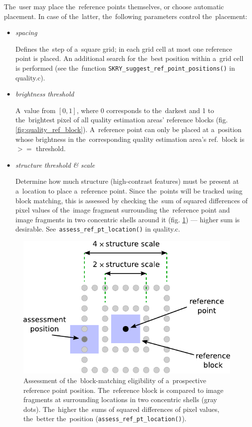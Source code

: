 \documentclass[12pt]{article}
\begin{document}
The~user may place the~reference points themselves, or choose automatic placement. In case of the~latter, the~following
parameters control the~placement:

\begin{itemize}
\item \emph{spacing}
\nopagebreak

Defines the~step of a~square grid; in each grid cell at most one reference point is placed. An additional search
for the~best position within a~grid cell is performed (see the~function \lstinline$SKRY_suggest_ref_point_positions()$
in {\ttfamily quality.c}).

\item \emph{brightness threshold}
\nopagebreak

A~value from $[0, 1]$, where 0 corresponds to the~darkest and 1 to the~brightest pixel of all quality estimation areas'
reference blocks (fig. \ref{fig:quality_ref_block}). A~reference point can only be placed at a~position whose brightness
in the~corresponding quality estimation area's ref.~block is $>=$ threshold.

\item \emph{structure threshold \& scale}
\nopagebreak

Determine how much structure (high-contrast features) must be present at a~location to place a~reference point. Since
the~points will be tracked using block matching, this is assessed by checking the~sum of squared differences of pixel
values of the~image fragment surrounding the~reference point and image fragments in two concentric shells around it
(fig. \ref{fig:ref_point_assess}) --- higher sum is desirable. See~\lstinline$assess_ref_pt_location()$ in
{\ttfamily quality.c}.

\end{itemize}

\begin{figure}[H]
\centering
\includegraphics{ref_point_assessment.pdf}
\caption{Assessment of the~block-matching eligibility of a~prospective reference point position. The~reference block is
compared to image fragments at surrounding locations in two concentric shells (gray dots). The~higher the~sums of
squared differences of pixel values, the~better the~position (\lstinline$assess_ref_pt_location()$).}
\label{fig:ref_point_assess}
\end{figure}
\end{document}
